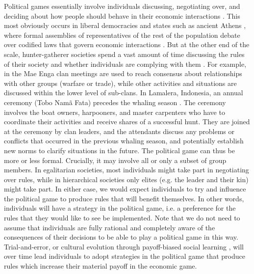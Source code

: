 \documentclass{rstb}
\begin{document}
\begin{linenumbers}
Political games essentially involve individuals discussing, negotiating over, and deciding about how people should behave in their economic interactions \cite{Powers:2016:a}. This most obviously occurs in liberal democracies and states such as ancient Athens \cite{Ober:2008:a}, where formal assemblies of representatives of the rest of the population debate over codified laws that govern economic interactions \cite{Reiter:1996:a}. But at the other end of the scale, hunter-gatherer societies spend a vast amount of time discussing the rules of their society and whether individuals are complying with them \cite{Boehm:1999:a}. For example, in the Mae Enga clan meetings are used to reach consensus about relationships with other groups (warfare or trade), while other activities and situations are discussed within the lower level of sub-clans. In Lamalera, Indonesia, an annual ceremony (Tobo Nam\~{a} Fata) precedes the whaling season \cite{Alvard:2002:a}. The ceremony involves the boat owners, harpooners, and master carpenters who have to coordinate their activities and receive shares of a successful hunt. They are joined at the ceremony by clan leaders, and the attendants discuss any problems or conflicts that occurred in the previous whaling season, and potentially establish new norms to clarify situations in the future. The political game can thus be more or less formal. Crucially, it may involve all or only a subset of group members. In egalitarian societies, most individuals might take part in negotiating over rules, while in hierarchical societies only elites (e.g. the leader and their kin) might take part. In either case, we would expect individuals to try and influence the political game to produce rules that will benefit themselves. In other words, individuals will have a strategy in the political game, i.e. a preference for the rules that they would like to see be implemented. Note that we do not need to assume that individuals are fully rational and completely aware of the consequences of their decisions to be able to play a political game in this way. Trial-and-error, or cultural evolution through payoff-biased social learning \cite{Boyd:1985:a}, will over time lead individuals to adopt strategies in the political game that produce rules which increase their material payoff in the economic game. 


\end{linenumbers}
\end{document}
